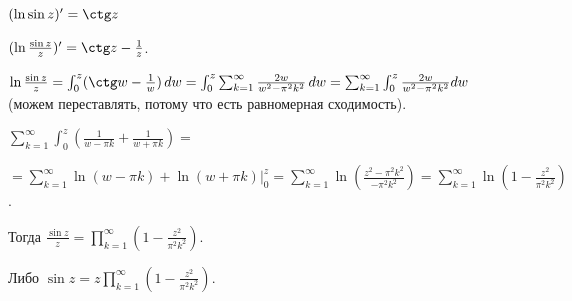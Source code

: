 \begin{example}
    $(\ln \sin z)' = \ctg z$

    $(\ln \frac{\sin z}{z})' = \ctg z - \frac{1}{z}$.

    $\ln \frac{\sin z}{z} = \int_{0}^{z} (\ctg w - \frac{1}{w}) \, dw = \int_{0}^{z} \sum_{k=1}^{\infty} \frac{2w}{w^2 - \pi^2 k^2} \, dw =
    \sum_{k = 1}^{\infty} \int_{0}^{z} {\frac{2w}{w^2 - \pi^2 k^2} dw}$ (можем переставлять, потому что есть равномерная сходимость).

    $\sum_{k = 1}^{\infty} \int_{0}^{z} \left ( \frac{1}{w - \pi k} + \frac{1}{w + \pi k} \right ) =$

    $= \sum_{k = 1}^{\infty} \ln (w - \pi k) + \ln (w + \pi k) \bigg |_{0}^z = \sum_{k = 1}^{\infty} \ln
    \left ( \frac{z^2 - \pi^2 k^2}{-\pi^2 k^2} \right ) = \sum_{k = 1}^{\infty} \ln \left ( 1 - \frac{z^2}{\pi^2 k^2} \right )$.

    Тогда $\frac{\sin z}{z} = \prod_{k = 1}^{\infty} \left(1 - \frac{z^2}{\pi^2 k^2} \right)$.

    Либо $\sin z = z \prod_{k = 1}^{\infty} \left(1 - \frac{z^2}{\pi^2 k^2} \right)$.
\end{example}

